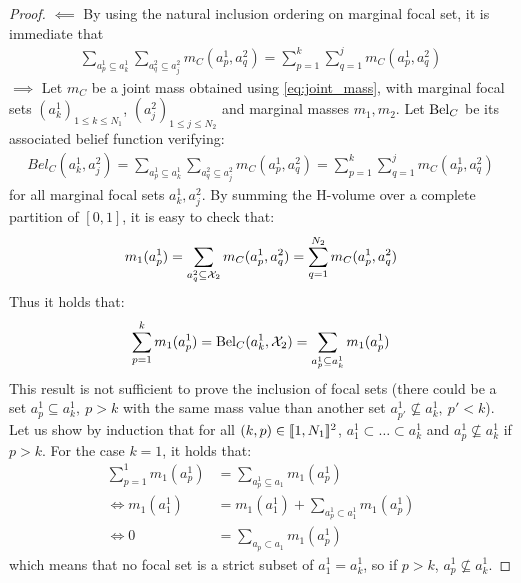 \begin{proof}

    $\impliedby$ By using the natural inclusion ordering on marginal focal set, it is immediate that
    \begin{align*}
        \sum_{a^1_p\subseteq a_k^1}\sum_{a^2_q\subseteq a_j^2}m_C(a^1_p, a^2_q) = \sum_{p=1}^k\sum_{q=1}^j m_C(a^1_p, a^2_q)
    \end{align*}
    $\implies$ Let $m_C$ be a joint mass obtained using \eqref{eq:joint_mass}, with marginal focal sets $(a^1_k)_{1\leqslant k\leqslant N_1}$, $(a^2_j)_{1\leqslant j\leqslant N_2}$ and marginal masses $m_1,m_2$. 
    Let $\mathrm{Bel}_C$ be its associated belief function verifying:
    \begin{align*}
        Bel_C(a^1_k, a^2_j) = \sum_{a^1_p\subseteq a^1_k}\sum_{a^2_q\subseteq a_j^2}m_C(a^1_p, a^2_q) = \sum_{p=1}^k\sum_{q=1}^j m_C(a^1_p, a^2_q)
    \end{align*}
    for all marginal focal sets $a^1_k,a^2_j$. By summing the H-volume over a complete partition of $[0,1]$, it is easy to check that:
    \begin{align*}
        m_1(a^1_p)=\sum_{a^2_q\subseteq \mathcal{X}_2}m_C(a^1_p, a^2_q)=\sum_{q=1}^{N_2}m_C(a^1_p, a^2_q)    
    \end{align*}
    Thus it holds that:
    \begin{align*}
        \sum_{p=1}^k m_1(a^1_p) = \mathrm{Bel}_C(a^1_k,\mathcal{X}_2)=\sum_{a^1_p\subseteq a_k^1}m_1(a^1_p)
    \end{align*}
    This result is not sufficient to prove the inclusion of focal sets (there could be a set $a^1_p\subseteq a^1_k,~p>k$ with the same mass value than another set $a^1_{p'}\not\subseteq a^1_k,~p' < k$). Let us show by induction that for all $(k, p)\in[\![1,N_1]\!]^2$, $a^1_1\subset\ldots\subset a^1_k$ and $a^1_p\not\subseteq a^1_k$ if $p>k$.
    For the case $k=1$, it holds that:
    \begin{align*}
        \sum_{p=1}^1m_1(a^1_p) &= \sum_{a^1_p\subseteq a_1}m_1(a^1_p)\\
        \Leftrightarrow m_1(a^1_1) &= m_1(a^1_1) + \sum_{a^1_p\subset a^1_1}m_1(a^1_p)\\
        \Leftrightarrow 0 &=\sum_{a_p\subset a_1}m_1(a^1_p)
    \end{align*}
    which means that no focal set is a strict subset of $a^1_1=a^1_k$, so if $p>k$, $a^1_p\not\subseteq a^1_k$. 
    

\end{proof}
